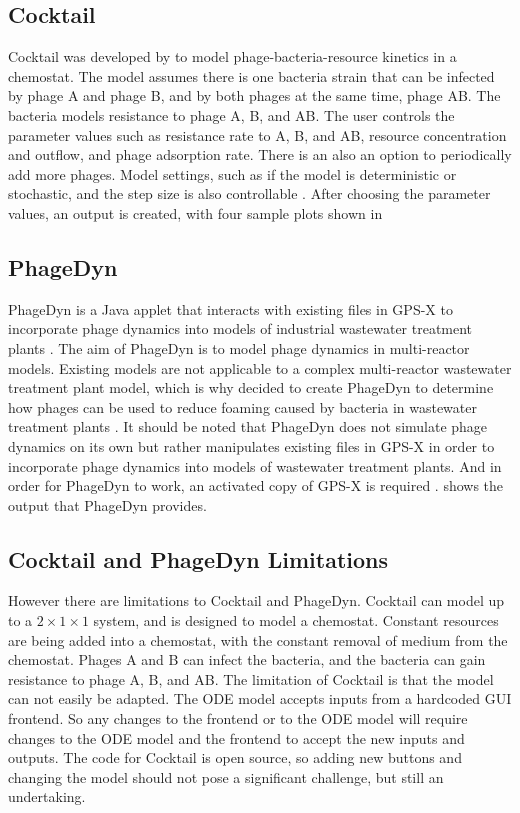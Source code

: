 \subsection{Cocktail}
Cocktail was developed by \citet{nilssonCocktailComputerProgram2022} to model phage-bacteria-resource kinetics in a chemostat. 
The model assumes there is one bacteria strain that can be infected by phage A and phage B, and by both phages at the same time, phage AB. 
The bacteria models resistance to phage A, B, and AB. 
The user controls the parameter values such as resistance rate to A, B, and AB, resource concentration and outflow, and phage adsorption rate. 
There is an also an option to periodically add more phages. 
Model settings, such as if the model is deterministic or stochastic, and the step size is also controllable \cite{nilssonCocktailComputerProgram2022}. 
After choosing the parameter values, an output is created, with four sample plots shown in 

\subsection{PhageDyn}
PhageDyn is a Java applet that interacts with existing files in GPS-X \cite{AdvancedWastewaterModelling} to incorporate phage dynamics into models of industrial wastewater treatment plants \cite{krysiak-baltynSimulationPhageDynamics2017}. 
The aim of PhageDyn is to model phage dynamics in multi-reactor models. 
Existing models are not applicable to a complex multi-reactor wastewater treatment plant model, which is why \citet{krysiak-baltynSimulationPhageDynamics2017} decided to create PhageDyn to determine how phages can be used to reduce foaming caused by bacteria in wastewater treatment plants \cite{heardEffectFilamentousBacteria2008}. 
It should be noted that PhageDyn does not simulate phage dynamics on its own but rather manipulates existing files in GPS-X in order to incorporate phage dynamics into models of wastewater treatment plants. 
And in order for PhageDyn to work, an activated copy of GPS-X is required \cite{krysiak-baltynSimulationPhageDynamics2017}. 
 shows the output that PhageDyn provides. 

\subsection{Cocktail and PhageDyn Limitations}
However there are limitations to Cocktail and PhageDyn. 
Cocktail can model up to a $2\times 1 \times 1$ system, and is designed to model a chemostat. 
Constant resources are being added into a chemostat, with the constant removal of medium from the chemostat. 
Phages A and B can infect the bacteria, and the bacteria can gain resistance to phage A, B, and AB. 
The limitation of Cocktail is that the model can not easily be adapted. 
The ODE model accepts inputs from a hardcoded GUI frontend. 
So any changes to the frontend or to the ODE model will require changes to the ODE model and the frontend to accept the new inputs and outputs. 
The code for Cocktail is open source, so adding new buttons and changing the model should not pose a significant challenge, but still an undertaking. 

